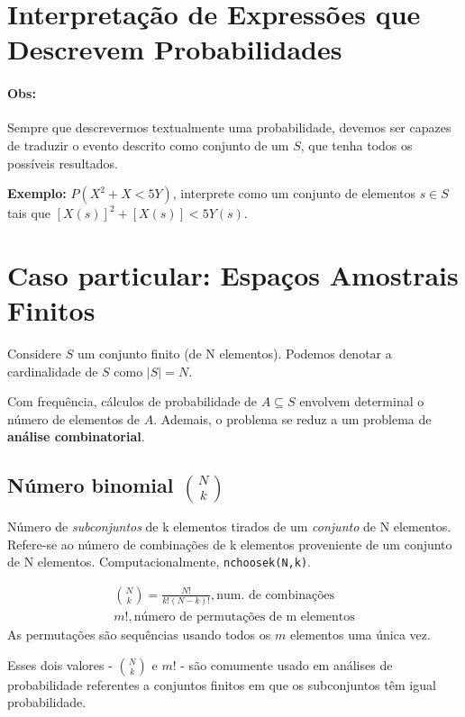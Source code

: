 \documentclass{article}
\renewcommand\bf[1]{\textbf{#1}}
\renewcommand\it[1]{\textit{#1}}
\begin{document}
\setlength{\abovedisplayskip}{12pt}
\setlength{\belowdisplayskip}{12pt}
\setlength{\abovedisplayshortskip}{0pt}
\setlength{\belowdisplayshortskip}{0pt}
\setlength{\jot}{0em}

\section{Interpretação de Expressões que Descrevem Probabilidades}
\paragraph{Obs:} Sempre que descrevermos textualmente uma probabilidade, devemos ser capazes de
traduzir o evento descrito como conjunto de um $S$, que tenha todos os possíveis resultados.

\bf{Exemplo:} $P(X^2 + X < 5 Y)$, interprete como um conjunto de elementos $s \in S$ tais que
$[X(s)]^2 + [X(s)] < 5 Y(s)$.

\section{Caso particular: Espaços Amostrais Finitos}
Considere $S$ um conjunto finito (de N elementos). Podemos denotar a cardinalidade de $S$ como $|S|
	= N$.

Com frequência, cálculos de probabilidade de $A \subseteq S$ envolvem determinal o número de
elementos de $A$. Ademais, o problema se reduz a um problema de \bf{análise combinatorial}.

\subsection{Número binomial ${N \choose k}$}
Número de \it{subconjuntos} de k elementos tirados de um \it{conjunto} de N elementos. Refere-se ao
número de combinações de k elementos proveniente de um conjunto de N elementos. Computacionalmente,
\texttt{nchoosek(N,k)}.

\begin{align*}
	{N \choose k} = \frac{N!}{k!(N-k)!}, \text{num. de combinações} \\[0.5em]
	m!, \text{número de permutações de m elementos}
\end{align*}
As permutações são sequências usando todos os $m$ elementos uma única vez.

Esses dois valores - ${N \choose k}$ e $m!$ - são comumente usado em análises de probabilidade
referentes a conjuntos finitos em que os subconjuntos têm igual probabilidade.
\end{document}
